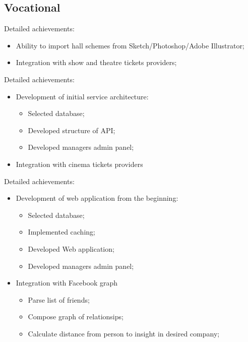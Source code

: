 \documentclass[11pt,a4paper,sans]{moderncv}        %
\begin{document}
\subsection{Vocational}
%
Detailed achievements:%
\begin{itemize}%
\item Ability to import hall schemes from Sketch/Photoshop/Adobe Illustrator;%
\item Integration with show and theatre tickets providers;%
\end{itemize}%
%
Detailed achievements:%
\begin{itemize}%
\item Development of initial service architecture:%
 \begin{itemize}%
  \item Selected database;%
  \item Developed structure of API;%
  \item Developed managers admin panel;%
  \end{itemize}%
\item Integration with cinema tickets providers%
\end{itemize}
Detailed achievements:%
\begin{itemize}%
\item Development of web application from the beginning:%
 \begin{itemize}%
  \item Selected database;%
  \item Implemented caching;%
  \item Developed Web application;%
  \item Developed managers admin panel;%
  \end{itemize}%
\item Integration with Facebook graph%
 \begin{itemize}%
  \item Parse list of friends;%
  \item Compose graph of relationsips;%
  \item Calculate distance from person to insight in desired company;%
 \end{itemize}
\end{itemize}
\end{document}
